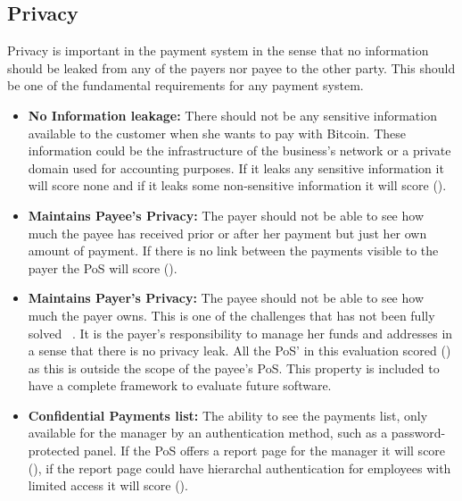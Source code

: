 \subsection{Privacy} Privacy is important in the payment system in the sense that no information should be leaked from any of the payers nor payee to the other party. This should be one of the fundamental requirements for any payment system.
\begin{itemize}

\item \textbf{No Information leakage: }There should not be any sensitive information available to the customer when she wants to pay with Bitcoin. These information could be the infrastructure of the business's network or a private domain used for accounting purposes. If it leaks any sensitive information it will score none and if it leaks some non-sensitive information it will score (\prt). 

\item \textbf{Maintains Payee's Privacy: }The payer should not be able to see how much the payee has received prior or after her payment but just her own amount of payment. If there is no link between the payments visible to the payer the PoS will score (\full).

\item \textbf{Maintains Payer's Privacy: }The payee should not be able to see how much the payer owns. This is one of the challenges that has not been fully solved ~\cite{androulaki2013evaluating}. It is the payer's responsibility to manage her funds and addresses in a sense that there is no privacy leak. All the PoS' in this evaluation scored (\prt) as this is outside the scope of the payee's PoS. This property is included to have a complete framework to evaluate future software.

\item \textbf{Confidential Payments list: }The ability to see the payments list, only available for the manager by an authentication method, such as a password-protected panel. If the PoS offers a report page for the manager it will score (\prt), if the report page could have hierarchal authentication for employees with limited access it will score (\full). 

\end{itemize}
